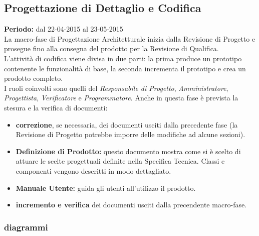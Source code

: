 \subsection{Progettazione di Dettaglio e Codifica}
\textbf{Periodo:} dal 22-04-2015 al 23-05-2015 \\
La macro-fase di Progettazione Architetturale inizia dalla Revisione di Progetto e prosegue fino alla consegna del prodotto per la Revisione di Qualifica. \\
L'attività di codifica viene divisa in due parti: la prima produce un prototipo contenente le funzionalità di base, la seconda incrementa il prototipo e crea un prodotto completo. \\
I ruoli coinvolti sono quelli del \textit{Responsabile di Progetto}, \textit{Amministratore}, \textit{Progettista}, \textit{Verificatore} e \textit{Programmatore}.
Anche in questa fase è prevista la stesura e la verifica di documenti:
\begin{itemize}
\item \textbf{correzione}, se necessaria, dei documenti usciti dalla precedente fase (la Revisione di Progetto potrebbe imporre delle modifiche ad alcune sezioni).
\item \textbf{Definizione di Prodotto:} questo documento mostra come si è scelto di attuare le scelte progettuali definite nella Specifica Tecnica. Classi e componenti vengono descritti in modo dettagliato.
\item \textbf{Manuale Utente:} guida gli utenti all'utilizzo il prodotto.
\item \textbf{incremento e verifica} dei documenti usciti dalla precendente macro-fase.
\end{itemize}

\newpage
\subsubsection{diagrammi}

